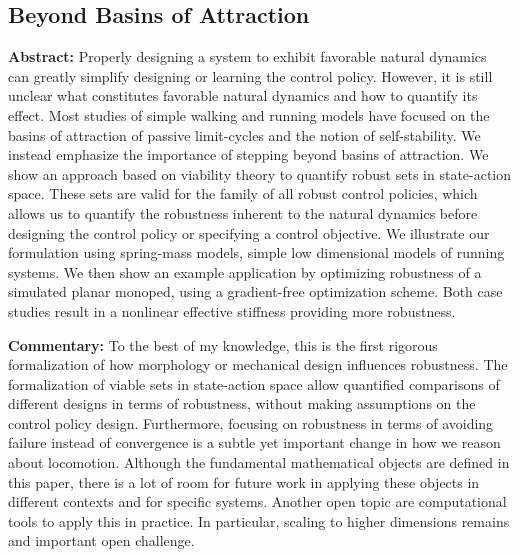 \subsection{Beyond Basins of Attraction}
\textbf{Abstract: }
Properly designing a system to exhibit favorable natural dynamics can greatly simplify designing or learning the control policy. However, it is still unclear what constitutes favorable natural dynamics and how to quantify its effect. Most studies of simple walking and running models have focused on the basins of attraction of passive limit-cycles and the notion of self-stability. We instead emphasize the importance of stepping beyond basins of attraction. We show an approach based on viability theory to quantify robust sets in state-action space. These sets are valid for the family of all robust control policies, which allows us to quantify the robustness inherent to the natural dynamics before designing the control policy or specifying a control objective.
We illustrate our formulation using spring-mass models, simple low dimensional models of running systems. We then show an example application by optimizing robustness of a simulated planar monoped, using a gradient-free optimization scheme. Both case studies result in a nonlinear effective stiffness providing more robustness. \par
\textbf{Commentary: }
To the best of my knowledge, this is the first rigorous formalization of how morphology or mechanical design influences robustness. The formalization of viable sets in state-action space allow quantified comparisons of different designs in terms of robustness, without making assumptions on the control policy design. Furthermore, focusing on robustness in terms of avoiding failure instead of convergence is a subtle yet important change in how we reason about locomotion. Although the fundamental mathematical objects are defined in this paper, there is a lot of room for future work in applying these objects in different contexts and for specific systems. Another open topic are computational tools to apply this in practice. In particular, scaling to higher dimensions remains and important open challenge. %

